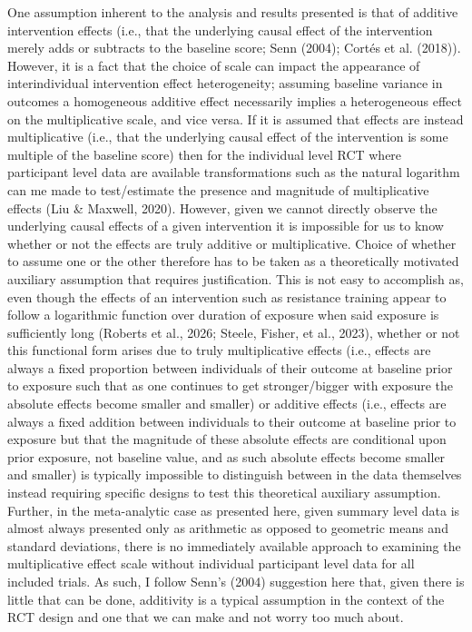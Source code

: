 \documentclass[
]{article}
\begin{document}
One assumption inherent to the analysis and results presented is that of
additive intervention effects (i.e., that the underlying causal effect
of the intervention merely adds or subtracts to the baseline score; Senn
(2004); Cortés et al. (2018)). However, it is a fact that the choice of
scale can impact the appearance of interindividual intervention effect
heterogeneity; assuming baseline variance in outcomes a homogeneous
additive effect necessarily implies a heterogeneous effect on the
multiplicative scale, and vice versa. If it is assumed that effects are
instead multiplicative (i.e., that the underlying causal effect of the
intervention is some multiple of the baseline score) then for the
individual level RCT where participant level data are available
transformations such as the natural logarithm can me made to
test/estimate the presence and magnitude of multiplicative effects (Liu
\& Maxwell, 2020). However, given we cannot directly observe the
underlying causal effects of a given intervention it is impossible for
us to know whether or not the effects are truly additive or
multiplicative. Choice of whether to assume one or the other therefore
has to be taken as a theoretically motivated auxiliary assumption that
requires justification. This is not easy to accomplish as, even though
the effects of an intervention such as resistance training appear to
follow a logarithmic function over duration of exposure when said
exposure is sufficiently long (Roberts et al., 2026; Steele, Fisher, et
al., 2023), whether or not this functional form arises due to truly
multiplicative effects (i.e., effects are always a fixed proportion
between individuals of their outcome at baseline prior to exposure such
that as one continues to get stronger/bigger with exposure the absolute
effects become smaller and smaller) or additive effects (i.e., effects
are always a fixed addition between individuals to their outcome at
baseline prior to exposure but that the magnitude of these absolute
effects are conditional upon prior exposure, not baseline value, and as
such absolute effects become smaller and smaller) is typically
impossible to distinguish between in the data themselves instead
requiring specific designs to test this theoretical auxiliary
assumption. Further, in the meta-analytic case as presented here, given
summary level data is almost always presented only as arithmetic as
opposed to geometric means and standard deviations, there is no
immediately available approach to examining the multiplicative effect
scale without individual participant level data for all included trials.
As such, I follow Senn's (2004) suggestion here that, given there is
little that can be done, additivity is a typical assumption in the
context of the RCT design and one that we can make and not worry too
much about.
\end{document}
